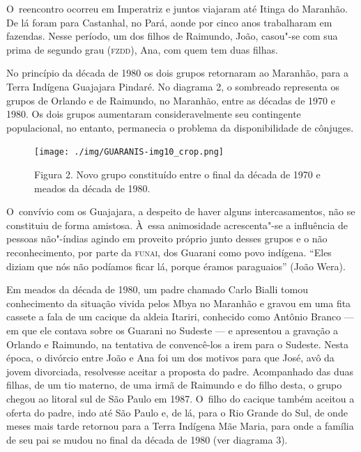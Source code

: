 O~reencontro ocorreu em Imperatriz e juntos viajaram até Itinga do
Maranhão. De lá foram para Castanhal, no Pará, aonde por cinco anos
trabalharam em fazendas. Nesse período, um dos filhos de Raimundo, João,
casou"-se com sua prima de segundo grau (\textsc{fzdd}), Ana, com quem tem duas
filhas.

No princípio da década de 1980 os dois grupos retornaram ao Maranhão,
para a Terra Indígena Guajajara Pindaré. No diagrama 2, o sombreado
representa os grupos de Orlando e de Raimundo, no Maranhão, entre as
décadas de 1970 e 1980. Os dois grupos aumentaram consideravelmente seu
contingente populacional, no entanto, permanecia o problema da
disponibilidade de cônjuges.

\begin{figure}[!hb]
  \centering
 \texttt{[image: ./img/GUARANIS-img10\_crop.png]}	
  \hfill
  \caption{Figura 2. Novo grupo constituído entre o final da década de 1970 e meados da década de 1980.}
\end{figure}
 
 

O~convívio com os Guajajara, a despeito de haver alguns intercasamentos,
não se constituiu de forma amistosa. À~essa animosidade acrescenta"-se a
influência de pessoas não"-índias agindo em proveito próprio junto
desses grupos
e o não reconhecimento, por parte da
\textsc{funai}, dos Guarani como povo indígena. ``Eles diziam que nós não
podíamos ficar lá, porque éramos paraguaios'' (João Wera). 

Em meados da década de 1980, um padre chamado Carlo Bialli tomou
conhecimento da situação vivida pelos Mbya no Maranhão e gravou em uma
fita cassete a fala de um cacique da aldeia Itariri, conhecido como
Antônio Branco --- em que ele contava sobre os Guarani no Sudeste --- e
apresentou a gravação a Orlando e Raimundo, na tentativa de
convencê-los a irem para o Sudeste. Nesta época, o divórcio entre João
e Ana foi um dos motivos para que José, avô da jovem divorciada,
resolvesse aceitar a proposta do padre. Acompanhado das duas filhas, de
um tio materno, de uma irmã de Raimundo e do filho desta, o grupo
chegou ao litoral sul de São Paulo em 1987. O~filho do cacique também
aceitou a oferta do padre, indo até São Paulo e, de lá, para o Rio
Grande do Sul, de onde meses mais tarde retornou para a Terra Indígena
Mãe Maria, para onde a família de seu pai se mudou no final da década
de 1980 (ver diagrama 3).

